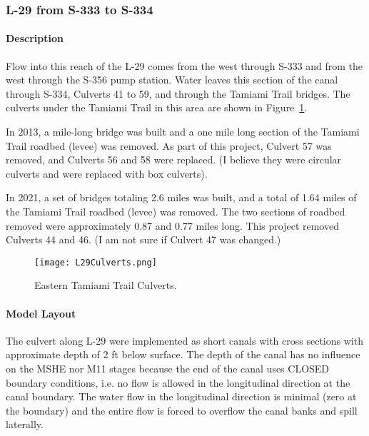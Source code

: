 \subsubsection{L-29 from S-333 to S-334}
\label{sec:L29fromS333toS334}

\paragraph{Description}
Flow into this reach of the L-29 comes from the west through S-333 and from the west through the S-356 pump station. Water leaves this section of the canal through S-334, Culverts 41 to 59, and through the Tamiami Trail bridges. The culverts under the Tamiami Trail in this area are shown in Figure~\ref{fig:L29Culverts}.

In 2013, a mile-long bridge was built and a one mile long section of the Tamiami Trail roadbed (levee) was removed. As part of this project, Culvert 57 was removed, and Culverts 56 and 58 were replaced. (I believe they were circular culverts and were replaced with box culverts).

In 2021, a set of bridges totaling 2.6 miles was built, and a total of 1.64 miles of the Tamiami Trail roadbed (levee) was removed. The two sections of roadbed removed were approximately 0.87 and 0.77 miles long.  This project removed Culverts 44 and 46. (I am not sure if Culvert 47 was changed.)

\begin{figure}[!h]
  \begin{center}
  \texttt{[image: L29Culverts.png]}
  \caption{Eastern Tamiami Trail Culverts.}
  \label{fig:L29Culverts}
  \end{center}
\end{figure}

\paragraph{Model Layout}

The culvert along L-29 were implemented as short canals with cross sections with approximate depth of 2 ft below surface. The depth of the canal has no influence on the MSHE nor M11 stages because the end of the canal uses CLOSED boundary conditions, i.e. no flow is allowed in the longitudinal direction at the canal boundary. The water flow in the longitudinal direction is minimal (zero at the boundary) and the entire flow is forced to overflow the canal banks and spill laterally.

